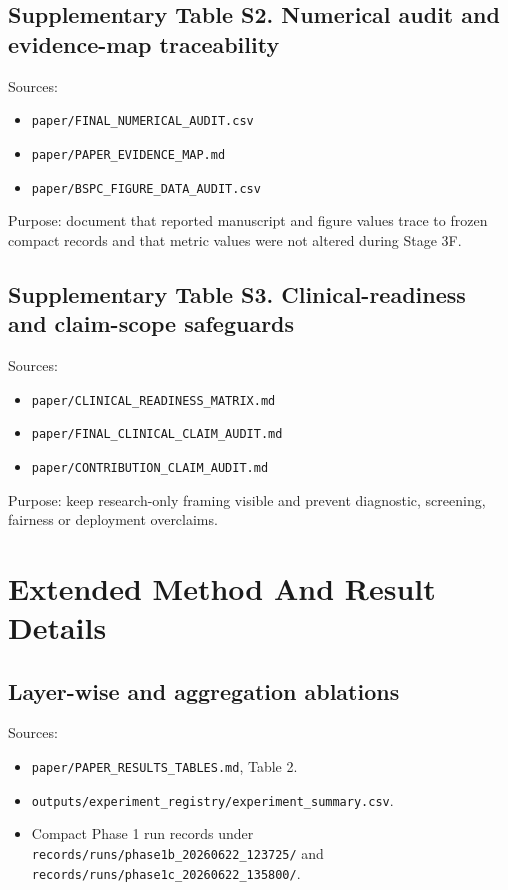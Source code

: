 \documentclass[lettersize,journal]{IEEEtran}
\begin{document}
\subsection{Supplementary Table S2. Numerical audit and evidence-map traceability}

Sources:

\begin{itemize}
\item \texttt{paper/FINAL\_NUMERICAL\_AUDIT.csv}
\item \texttt{paper/PAPER\_EVIDENCE\_MAP.md}
\item \texttt{paper/BSPC\_FIGURE\_DATA\_AUDIT.csv}
\end{itemize}

Purpose: document that reported manuscript and figure values trace to frozen compact records and that metric values were not altered during Stage 3F.

\subsection{Supplementary Table S3. Clinical-readiness and claim-scope safeguards}

Sources:

\begin{itemize}
\item \texttt{paper/CLINICAL\_READINESS\_MATRIX.md}
\item \texttt{paper/FINAL\_CLINICAL\_CLAIM\_AUDIT.md}
\item \texttt{paper/CONTRIBUTION\_CLAIM\_AUDIT.md}
\end{itemize}

Purpose: keep research-only framing visible and prevent diagnostic, screening, fairness or deployment overclaims.

\section{Extended Method And Result Details}

\subsection{Layer-wise and aggregation ablations}

Sources:

\begin{itemize}
\item \texttt{paper/PAPER\_RESULTS\_TABLES.md}, Table 2.
\item \texttt{outputs/experiment\_registry/experiment\_summary.csv}.
\item Compact Phase 1 run records under \texttt{records/runs/phase1b\_20260622\_123725/} and \texttt{records/runs/phase1c\_20260622\_135800/}.
\end{itemize}
\end{document}
